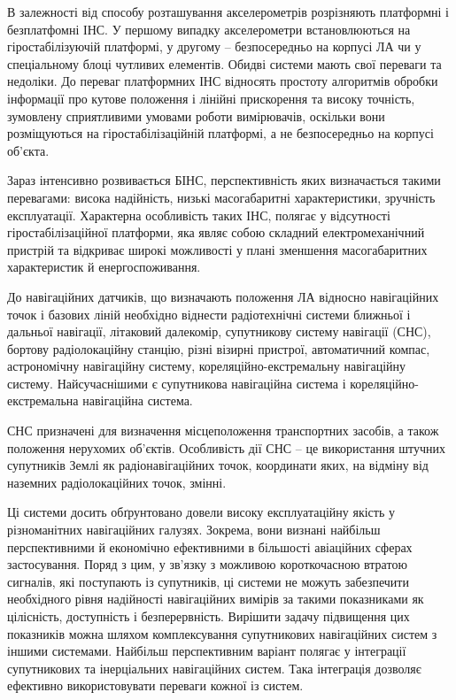 В залежності від способу розташування акселерометрів  розрізняють платформні і 
безплатфомні ІНС. У першому випадку акселерометри  встановлюються на 
гіростабілізуючій платформі, у другому – безпосередньо на корпусі ЛА чи у 
спеціальному блоці чутливих елементів. Обидві системи мають свої переваги 
та недоліки. До переваг платформних ІНС відносять простоту алгоритмів обробки 
інформації про кутове положення і лінійні прискорення та високу точність, 
зумовлену сприятливими умовами роботи вимірювачів, оскільки вони розміщуються 
на гіростабілізаційній платформі, а не безпосередньо на корпусі об’єкта.

Зараз інтенсивно розвивається БІНС, перспективність яких визначається 
такими перевагами: висока надійність, низькі масогабаритні характеристики, 
зручність експлуатації. Характерна особливість таких ІНС, полягає у 
відсутності гіростабілізаційної платформи, яка являє собою складний 
електромеханічний пристрій та відкриває широкі можливості у плані 
зменшення масогабаритних характеристик й енергоспоживання.

До навігаційних датчиків, що визначають положення ЛА відносно навігаційних 
точок і базових ліній необхідно віднести радіотехнічні системи ближньої і 
дальньої навігації, літаковий далекомір, супутникову систему навігації (СНС), 
бортову радіолокаційну станцію, різні візирні пристрої, автоматичний компас, 
астрономічну навігаційну систему, кореляційно-екстремальну навігаційну систему. 
Найсучаснішими є супутникова навігаційна система і кореляційно-екстремальна 
навігаційна система.

СНС призначені для визначення місцеположення транспортних засобів, а також 
положення нерухомих об’єктів. Особливість дії СНС  – це використання штучних 
супутників Землі як радіонавігаційних точок, координати яких, на відміну від 
наземних радіолокаційних точок, змінні. 

Ці системи досить обґрунтовано довели високу експлуатаційну якість у 
різноманітних навігаційних галузях. Зокрема, вони визнані найбільш 
перспективними й економічно ефективними в більшості авіаційних сферах 
застосування. Поряд з цим, у зв’язку з можливою короткочасною втратою 
сигналів, які поступають із супутників, ці системи не можуть забезпечити 
необхідного рівня надійності навігаційних вимірів за такими показниками 
як цілісність, доступність і безперервність. Вирішити задачу підвищення 
цих показників можна шляхом комплексування супутникових навігаційних систем 
з іншими системами. Найбільш перспективним варіант полягає у інтеграції 
супутникових та інерціальних навігаційних систем. Така інтеграція дозволяє 
ефективно використовувати переваги кожної із систем. 

